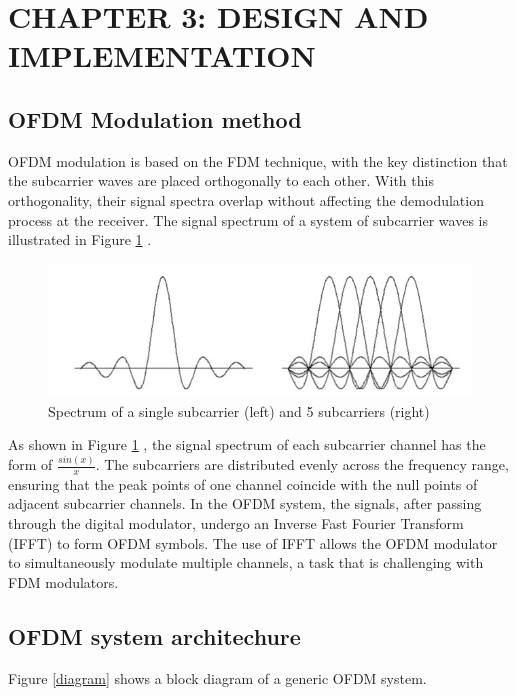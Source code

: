 \section*{CHAPTER 3:  DESIGN AND IMPLEMENTATION}
\setcounter{section}{3}
\setcounter{subsection}{0}
\setcounter{figure}{0}
\setcounter{table}{0}

\subsection{OFDM Modulation method}
OFDM modulation is based on the FDM technique, with the key distinction that the subcarrier waves are placed orthogonally to each other. With this orthogonality, their signal spectra overlap without affecting the demodulation process at the receiver. The signal spectrum of a system of subcarrier waves is illustrated in Figure \ref{Spectrum} \cite{b6}.

\begin{figure}[htbp]
    \centering
    \includegraphics[width=\textwidth]{Figures/Spectrum}
    \caption{Spectrum of a single subcarrier (left) and 5 subcarriers (right)}
    \label{Spectrum}    
\end{figure}

As shown in Figure \ref{Spectrum} \cite{OFDM2010}, the signal spectrum of each subcarrier channel has the form of $\frac{sin(x)}{x}$. The subcarriers are distributed evenly across the frequency range, ensuring that the peak points of one channel coincide with the null points of adjacent subcarrier channels. In the OFDM system, the signals, after passing through the digital modulator, undergo an Inverse Fast Fourier Transform (IFFT) to form OFDM symbols. The use of IFFT allows the OFDM modulator to simultaneously modulate multiple channels, a task that is challenging with FDM modulators.

\subsection{OFDM system architechure}
Figure \ref{diagram} shows a block diagram of a generic OFDM system.

